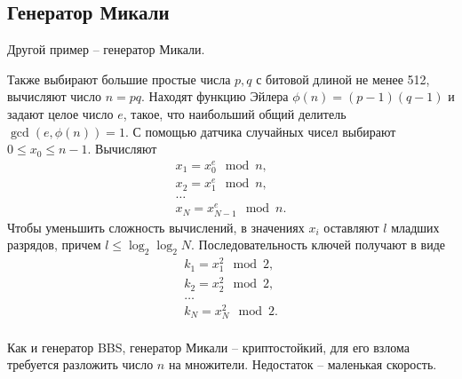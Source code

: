 ﻿\subsection{Генератор Микали}

Другой пример -- генератор Микали.

Также выбирают большие простые числа $p,q$ с битовой длиной не менее 512, вычисляют число $n = pq$. Находят функцию Эйлера $\phi(n) = (p-1) (q-1)$ и задают целое число $e$, такое, что наибольший общий делитель $\gcd(e, \phi(n)) = 1$. С помощью датчика случайных чисел выбирают $0 \leq x_{0} \leq n-1$. Вычисляют
\[ \begin{array}{l}
    x_1 = x_0^e \mod n, \\
    x_2 = x_1^e \mod n, \\
    \dots \\
    x_N = x_{N-1}^e \mod n.
\end{array} \]
Чтобы уменьшить сложность вычислений, в значениях $x_i$ оставляют $l$ младших разрядов, причем $l \leq \log_2 \log_2 N$. Последовательность ключей получают в виде
\[ \begin{array}{l}
    k_1 = x_1^2 \mod 2, \\
    k_2 = x_2^2 \mod 2, \\
    \dots \\
    k_N = x_N^2 \mod 2. \\
\end{array} \]

Как и генератор BBS, генератор Микали -- криптостойкий, для его взлома требуется разложить число $n$ на множители. Недостаток -- маленькая скорость.